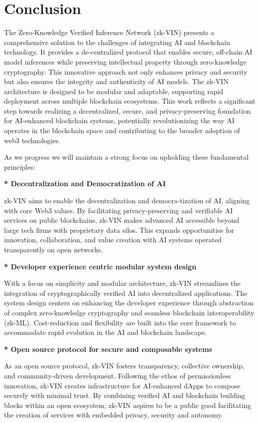 \documentclass[conference]{IEEEtran}
\begin{document}
\section{Conclusion}
The Zero-Knowledge Veriﬁed Inference Network (zk-VIN) presents a comprehensive solution to the challenges of integrating AI and blockchain technology. It provides a de-centralized protocol that enables secure, off-chain AI model inferences while preserving intellectual property through zero-knowledge cryptography. This innovative approach not only enhances privacy and security but also ensures the integrity and authenticity of AI models. The zk-VIN architecture is designed to be modular and adaptable, supporting rapid deployment across multiple blockchain ecosystems. This work reﬂects a signiﬁcant step towards realizing a decentralized, secure, and privacy-preserving foundation for AI-enhanced blockchain systems, potentially revolutionizing the way AI operates in the blockchain space and contributing to the broader adoption of web3 technologies.

As we progress we will maintain a strong focus on upholding these fundamental principles:

\textbf{* Decentralization and Democratization of AI}

zk-VIN aims to enable the decentralization and democra-tization of AI, aligning with core Web3 values. By facilitating privacy-preserving and veriﬁable AI services on public blockchains, zk-VIN makes advanced AI accessible beyond large tech ﬁrms with proprietary data silos. This expands opportunities for innovation, collaboration, and value creation with AI systems operated transparently on open networks.

\textbf{* Developer experience centric modular system design}

With a focus on simplicity and modular architecture, zk-VIN streamlines the integration of cryptographically veriﬁed AI into decentralized applications. The system design centers on enhancing the developer experience through abstraction of complex zero-knowledge cryptography and seamless blockchain interoperability (zk-ML). Cost-reduction and ﬂexibility are built into the core framework to accommodate rapid evolution in the AI and blockchain landscape.

\textbf{* Open source protocol for secure and composable systems}

As an open source protocol, zk-VIN fosters transparency, collective ownership, and community-driven development. Following the ethos of permissionless innovation, zk-VIN creates infrastructure for AI-enhanced dApps to compose securely with minimal trust. By combining veriﬁed AI and blockchain building blocks within an open ecosystem, zk-VIN aspires to be a public good facilitating the creation of services with embedded privacy, security and autonomy.
\end{document}
